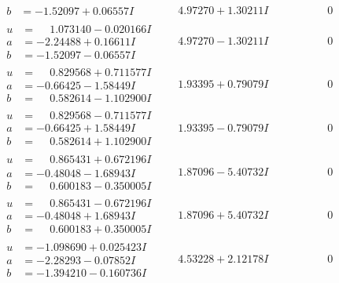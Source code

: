 \documentclass[1p]{elsarticle_modified}
\theoremstyle{definition}
\begin{document}
$$\begin{array}{c|c|c}
\begin{aligned}
b &= -1.52097 + 0.06557 I\end{aligned}
 & \phantom{-}4.97270 + 1.30211 I & \phantom{-0.000000 } 0 \\ \hline\begin{aligned}
u &= \phantom{-}1.073140 - 0.020166 I \\
a &= -2.24488 + 0.16611 I \\
b &= -1.52097 - 0.06557 I\end{aligned}
 & \phantom{-}4.97270 - 1.30211 I & \phantom{-0.000000 } 0 \\ \hline\begin{aligned}
u &= \phantom{-}0.829568 + 0.711577 I \\
a &= -0.66425 - 1.58449 I \\
b &= \phantom{-}0.582614 - 1.102900 I\end{aligned}
 & \phantom{-}1.93395 + 0.79079 I & \phantom{-0.000000 } 0 \\ \hline\begin{aligned}
u &= \phantom{-}0.829568 - 0.711577 I \\
a &= -0.66425 + 1.58449 I \\
b &= \phantom{-}0.582614 + 1.102900 I\end{aligned}
 & \phantom{-}1.93395 - 0.79079 I & \phantom{-0.000000 } 0 \\ \hline\begin{aligned}
u &= \phantom{-}0.865431 + 0.672196 I \\
a &= -0.48048 - 1.68943 I \\
b &= \phantom{-}0.600183 - 0.350005 I\end{aligned}
 & \phantom{-}1.87096 - 5.40732 I & \phantom{-0.000000 } 0 \\ \hline\begin{aligned}
u &= \phantom{-}0.865431 - 0.672196 I \\
a &= -0.48048 + 1.68943 I \\
b &= \phantom{-}0.600183 + 0.350005 I\end{aligned}
 & \phantom{-}1.87096 + 5.40732 I & \phantom{-0.000000 } 0 \\ \hline\begin{aligned}
u &= -1.098690 + 0.025423 I \\
a &= -2.28293 - 0.07852 I \\
b &= -1.394210 - 0.160736 I\end{aligned}
 & \phantom{-}4.53228 + 2.12178 I & \phantom{-0.000000 } 0 \\ \hline\begin{aligned}

\end{aligned}
\end{array}$$
\end{document}

